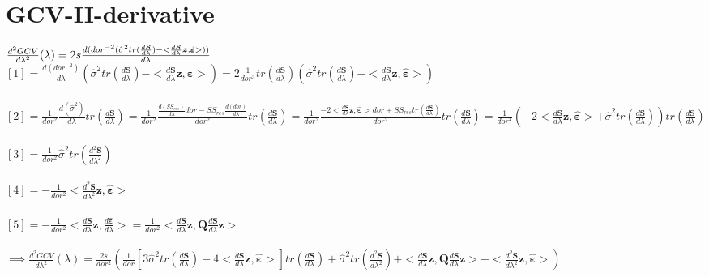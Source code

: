 \documentclass[11pt,twoside]{report}
\begin{document}
\section{GCV-II-derivative}
$ \frac{d^2GCV}{d\lambda^2}(\lambda) = 2s\frac{d({dor}^{-2}(\hat{\sigma}^2tr(\frac{d\mathbold{S}}{d\lambda}) - <\frac{d\mathbold{S}}{d\lambda}\mathbold{z}, \hat{\mathbold{\varepsilon}}>))}{d\lambda}\\$
\\
$ [1] = \frac{d(dor^{-2})}{d\lambda}(\hat{\sigma}^2tr(\frac{d\mathbold{S}}{d\lambda}) - <\frac{d\mathbold{S}}{d\lambda}\mathbold{z}, \hat{\mathbold{\varepsilon}}>) =  2\frac{1}{dor^3}tr(\frac{d\mathbold{S}}{d\lambda})(\hat{\sigma}^2tr(\frac{d\mathbold{S}}{d\lambda}) - <\frac{d\mathbold{S}}{d\lambda}\mathbold{z}, \hat{\mathbold{\varepsilon}}>)$\\
\\
$ [2] = \frac{1}{dor^2}\frac{d(\hat{\sigma}^2)}{d\lambda}tr(\frac{d\mathbold{S}}{d\lambda}) = \frac{1}{dor^2}\frac{\frac{d(SS_{res})}{d\lambda}dor - SS_{res}\frac{d(dor)}{d\lambda}}{dor^2}tr(\frac{d\mathbold{S}}{d\lambda}) = \frac{1}{dor^2}\frac{-2<\frac{d\mathbold{S}}{d\lambda}\mathbold{z}, \hat{\mathbold{\varepsilon}}>dor + SS_{res}tr(\frac{d\mathbold{S}}{d\lambda})}{dor^2}tr(\frac{d\mathbold{S}}{d\lambda}) = \frac{1}{dor^3}(-2<\frac{d\mathbold{S}}{d\lambda}\mathbold{z}, \hat{\mathbold{\varepsilon}}> + \hat{\sigma}^2tr(\frac{d\mathbold{S}}{d\lambda}))tr(\frac{d\mathbold{S}}{d\lambda})$\\
\\
$ [3] =  \frac{1}{dor^2}\hat{\sigma}^2tr(\frac{d^2\mathbold{S}}{d\lambda^2})$\\
\\
$ [4] = - \frac{1}{dor^2}<\frac{d^2\mathbold{S}}{d\lambda^2}\mathbold{z}, \hat{\mathbold{\varepsilon}}>$\\
\\
$ [5] = - \frac{1}{dor^2}<\frac{d\mathbold{S}}{d\lambda}\mathbold{z}, \frac{d\hat{\mathbold{\varepsilon}}}{d\lambda}> = \frac{1}{dor^2}<\frac{d\mathbold{S}}{d\lambda}\mathbold{z},\mathbold{Q} \frac{d\mathbold{S}}{d\lambda}\mathbold{z}>$\\
\\
$\implies  \frac{d^2GCV}{d\lambda^2}(\lambda) = \frac{2s}{dor^2}(\frac{1}{dor}[3\hat{\sigma}^2tr(\frac{d\mathbold{S}}{d\lambda}) - 4<\frac{d\mathbold{S}}{d\lambda}\mathbold{z}, \hat{\mathbold{\varepsilon}}>]tr(\frac{d\mathbold{S}}{d\lambda}) + \hat{\sigma}^2tr(\frac{d^2\mathbold{S}}{d\lambda^2}) + <\frac{d\mathbold{S}}{d\lambda}\mathbold{z},\mathbold{Q} \frac{d\mathbold{S}}{d\lambda}\mathbold{z}> - <\frac{d^2\mathbold{S}}{d\lambda^2}\mathbold{z}, \hat{\mathbold{\varepsilon}}>)$
\end{document}
